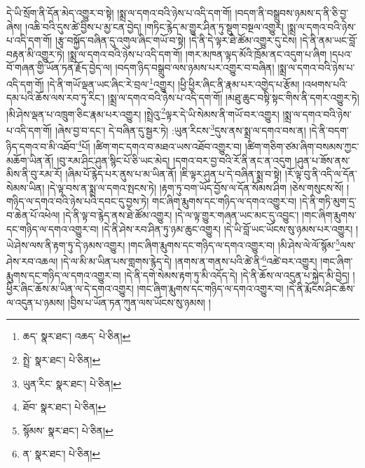 དེ་ཡི་སྲོག་ནི་དོན་མེད་འགྱུར་བ་སྟེ། །སྨྲ་ལ་དགའ་བའི་ཉེས་པ་འདི་དག་གོ། །བདག་ནི་བསྒྲུབས་ཉམས་ད་ནི་ཅི་བྱ་ཞེས། །འཆི་བའི་དུས་ཚེ་བྱིས་པ་མྱ་ངན་བྱེད། །གཏིང་རྙེད་མ་གྱུར་ཤིན་ཏུ་སྡུག་བསྔལ་འགྱུར། །སྨྲ་ལ་དགའ་བའི་ཉེས་པ་འདི་དག་གོ། །རྩྭ་བསྐྱོད་བཞིན་དུ་འགུལ་ཞིང་གཡོ་བ་སྟེ། །དེ་ནི་དེ་ལྟར་ཐེ་ཚོམ་འགྱུར་དུ་ངེས། །དེ་ནི་ནམ་ཡང་བློ་བརྟན་མི་འགྱུར་ཏེ། །སྨྲ་ལ་དགའ་བའི་ཉེས་པ་འདི་དག་གོ། །གར་མཁན་ལྟད་མོའི་ཁྲོམ་ནང་འདུག་པ་ཞིག །དཔའ་བོ་གཞན་གྱི་ཡོན་ཏན་རྗོད་བྱེད་ལ། །བདག་ཉིད་བསྒྲུབ་ལས་ཉམས་པར་འགྱུར་བ་བཞིན། །སྨྲ་ལ་དགའ་བའི་ཉེས་པ་འདི་དག་གོ། །དེ་ནི་གཡོ་ལྡན་ཡང་ཞིང་རེ་བྲལ་\footnote{ཆད་  སྣར་ཐང་། འཆད་  པེ་ཅིན། }འགྱུར། །ཕྱི་ཕྱིར་ཞིང་ནི་རྣམ་པར་འགྱེད་པ་རྩོམ། །འཕགས་པའི་དམ་པའི་ཆོས་ལས་རབ་ཏུ་རིང་། །སྨྲ་ལ་དགའ་བའི་ཉེས་པ་འདི་དག་གོ། །མཐུ་ཆུང་བསྟི་སྟང་གིས་ནི་དགར་འགྱུར་ཏེ། །མི་ཤེས་ལྡན་པ་འཁྲུག་ཅིང་རྣམ་པར་འགྱུར། །སྤྲེའུ་\footnote{སྤྲེ་  སྣར་ཐང་།  པེ་ཅིན། }ལྟར་དེ་ཡི་སེམས་ནི་གཡོ་བར་འགྱུར། །སྨྲ་ལ་དགའ་བའི་ཉེས་པ་འདི་དག་གོ། །ཞེས་བྱ་བ་དང་། དེ་བཞིན་དུ་སྦྱར་ཏེ། :ཡུན་རིངས་\footnote{ཡུན་རིང་  སྣར་ཐང་།  པེ་ཅིན། }དུས་ནས་སྨྲ་ལ་དགའ་བས་ན། །དེ་ནི་བདག་ཉིད་དགའ་བ་མི་འཐོབ་\footnote{ཐོབ་  སྣར་ཐང་།  པེ་ཅིན། }པོ། །ཚིག་གང་དགའ་བ་མཐའ་ཡས་འཐོབ་འགྱུར་བ། །ཚིག་གཅིག་ཙམ་ཞིག་བསམས་ཀྱང་མཆོག་ཡིན་ནོ། །བུ་རམ་ཤིང་ཤུན་སྙིང་པོ་ཅི་ཡང་མེད། །དགའ་བར་བྱ་བའི་རོ་ནི་ནང་ན་འདུག །ཤུན་པ་ཟོས་ནས་མིས་ནི་བུ་རམ་རོ། །ཞིམ་པོ་རྙེད་པར་ནུས་པ་མ་ཡིན་ནོ། །ཇི་ལྟར་ཤུན་པ་དེ་བཞིན་སྨྲ་བ་སྟེ། །རོ་ལྟ་བུ་ནི་འདི་ལ་དོན་སེམས་ཡིན། །དེ་ལྟ་བས་ན་སྨྲ་ལ་དགའ་སྤངས་ཏེ། །རྟག་ཏུ་བག་ཡོད་བྱོས་ལ་དོན་སོམས་ཤིག །ཅེས་གསུངས་སོ། །གཉིད་ལ་དགའ་བའི་ཉེས་པའི་དབང་དུ་བྱས་ཏེ། གང་ཞིག་རྨུགས་དང་གཉིད་ལ་དགའ་འགྱུར་བ། །དེ་ནི་གཏི་མུག་དྲ་བ་ཆེན་པོ་འཕེལ། །དེ་ནི་ལྟ་བ་རྙེད་ནས་ཐེ་ཚོམ་འགྱུར། །དེ་ལ་ལྟ་གྱུར་གཞན་ཡང་མང་དུ་འབྱུང་། །གང་ཞིག་རྨུགས་དང་གཉིད་ལ་དགའ་འགྱུར་བ། །དེ་ནི་ཤེས་རབ་ཤིན་ཏུ་ཉམ་ཆུང་འགྱུར། །དེ་ཡི་བློ་ཡང་ཡོངས་སུ་ཉམས་པར་འགྱུར། །ཡེ་ཤེས་ལས་ནི་རྟག་ཏུ་དེ་ཉམས་འགྱུར། །གང་ཞིག་རྨུགས་དང་གཉིད་ལ་དགའ་འགྱུར་བ། །མི་ཤེས་ལེ་ལོ་སྙོམ་\footnote{སྙོམས་  སྣར་ཐང་།  པེ་ཅིན། }ལས་ཤེས་རབ་འཆལ། །དེ་ལ་མི་མ་ཡིན་པས་གླགས་རྙེད་དེ། །ནགས་ན་གནས་པའི་ཚེ་ནི་\footnote{ན་  སྣར་ཐང་།  པེ་ཅིན། }འཚེ་བར་འགྱུར། །གང་ཞིག་རྨུགས་དང་གཉིད་ལ་དགའ་འགྱུར་བ། །དེ་ནི་དགེ་སེམས་རྟག་ཏུ་མི་འདོད་དེ། །དེ་ནི་ཆོས་ལ་འདུན་པ་སྐྱེད་མི་བྱེད། །ཕྱིར་ཞིང་ཆོས་མ་ཡིན་ལ་དེ་དགའ་འགྱུར། །གང་ཞིག་རྨུགས་དང་གཉིད་ལ་དགའ་འགྱུར་བ། །དེ་ནི་རྨོངས་ཤིང་ཆོས་ལ་འདུན་པ་ཉམས། །བྱིས་པ་ཡོན་ཏན་ཀུན་ལས་ཡོངས་སུ་ཉམས། །
